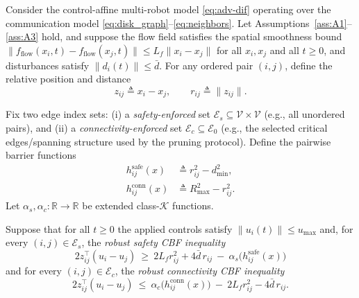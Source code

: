 
\begin{theorem}
\label{thm:robust-invariance}
Consider the control-affine multi-robot model \eqref{eq:adv-dif} operating over the communication model \eqref{eq:disk_graph}--\eqref{eq:neighbors}. Let Assumptions~\ref{ass:A1}--\ref{ass:A3} hold, and suppose the flow field satisfies the spatial smoothness bound
\(
\|f_{\text{flow}}(x_i,t)-f_{\text{flow}}(x_j,t)\|\le L_f\|x_i-x_j\|
\)
for all $x_i,x_j$ and all $t\ge 0$, and disturbances satisfy $\|d_i(t)\|\le \bar d$.
For any ordered pair $(i,j)$, define the relative position and distance
\[
z_{ij} \triangleq x_i-x_j,\qquad r_{ij}\triangleq \|z_{ij}\|.
\]

Fix two edge index sets:
(i) a \emph{safety-enforced} set $\mathcal{E}_s\subseteq \mathcal{V}\times\mathcal{V}$ (e.g., all unordered pairs), and
(ii) a \emph{connectivity-enforced} set $\mathcal{E}_c \subseteq \mathcal{E}_0$ (e.g., the selected critical edges/spanning structure used by the pruning protocol).
Define the pairwise barrier functions
\begin{align}
h^{\mathrm{safe}}_{ij}(x) &\triangleq r_{ij}^2 - d_{\min}^2,
\label{eq:h_safe}\\
h^{\mathrm{conn}}_{ij}(x) &\triangleq R_{\max}^2 - r_{ij}^2.
\label{eq:h_conn}
\end{align}
Let $\alpha_s,\alpha_c:\mathbb{R}\to\mathbb{R}$ be extended class-$\mathcal{K}$ functions.

Suppose that for all $t\ge 0$ the applied controls satisfy $\|u_i(t)\|\le u_{\max}$ and, for every $(i,j)\in \mathcal{E}_s$, the \emph{robust safety CBF inequality}
\begin{equation}
\boxed{
2 z_{ij}^\top (u_i-u_j)\ \ge\ 2L_f r_{ij}^2 + 4\bar d\, r_{ij}\ -\ \alpha_s\!\big(h^{\mathrm{safe}}_{ij}(x)\big)
}
\label{eq:robust_safe_cbf}
\end{equation}
and for every $(i,j)\in \mathcal{E}_c$, the \emph{robust connectivity CBF inequality}
\begin{equation}
\boxed{
2 z_{ij}^\top (u_i-u_j)\ \le\ \alpha_c\!\big(h^{\mathrm{conn}}_{ij}(x)\big)\ -\ 2L_f r_{ij}^2 - 4\bar d\, r_{ij}.
}
\label{eq:robust_conn_cbf}
\end{equation}


\end{theorem}
